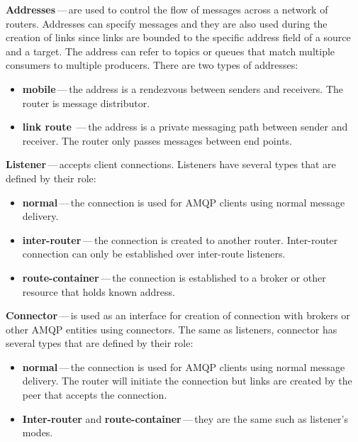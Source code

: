 \begin{description}
	\setlength\itemsep{0em}
	\item \textbf{Addresses\footnotemark{}}\,---\,are used to control the flow of messages across a network of routers. Addresses can specify messages and they are also used during the creation of links since links are bounded to the specific address field of a source and a target. The address can refer to topics or queues that match multiple consumers to multiple producers. There are two types of addresses:
	\begin{itemize}
		\setlength\itemsep{0em}
		\item \textbf{mobile}\,---\,the address is a rendezvous between senders and receivers. The router is message distributor.
		\item \textbf{link route}	\,---\,the address is a private messaging path between sender and receiver. The router only passes messages between end points.
	\end{itemize}
	\item \textbf{Listener}\,---\,accepts client connections. Listeners have several types that are defined by their role:
	\begin{itemize}
		\setlength\itemsep{0em}
		\item \textbf{normal}\,---\,the connection is used for AMQP clients using normal message delivery.
		\item \textbf{inter-router}\,---\,the connection is created to another router. Inter-router connection can only be established over inter-route listeners.
		\item \textbf{route-container}\,---\,the connection is established to a broker or other resource that holds known address.
	\end{itemize}
	\item \textbf{Connector}\,---\,is used as an interface for creation of connection with brokers or other AMQP entities using connectors. The same as listeners, connector has several types that are defined by their role:
	\begin{itemize}
		\setlength\itemsep{0em}
		\item \textbf{normal}\,---\,the connection is used for AMQP clients using normal message delivery. The router will initiate the connection but links are created by the peer that accepts the connection.
		\item \textbf{Inter-router} and \textbf{route-container}\,---\,they are the same such as listener's modes.
	\end{itemize}
\end{description}


